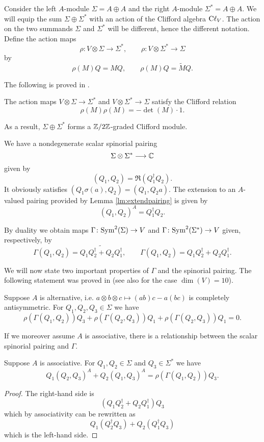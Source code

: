 \documentclass[10pt, oneside]{article}
\begin{document}
Consider the left $A$-module $\Sigma=A\oplus A$ and the right $A$-module $\Sigma^* = A\oplus A$.
We will equip the sum $\Sigma \oplus \Sigma^*$ with an action of the Clifford algebra ${\rm C}\ell_V$.  
The action on the two summands $\Sigma$ and $\Sigma^*$ will be different, hence the different notation.  
Define the action maps
\[\rho \colon V \otimes \Sigma\rightarrow \Sigma^*,\qquad \rho \colon V\otimes \Sigma^*\rightarrow \Sigma\]
by
\[\rho(M)Q = M Q,\qquad \rho(M)Q = \widetilde{M} Q.\]

The following is proved in \cite[Proposition 6]{BaezHuerta}.

\begin{prop}
The action maps $V\otimes \Sigma\rightarrow \Sigma^*$ and $V\otimes \Sigma^*\rightarrow \Sigma$ satisfy the Clifford relation
\[\rho(M)\rho(M) = -\det(M)\cdot 1.\]
\end{prop}

As a result, $\Sigma\oplus \Sigma^*$ forms a $\mathbb Z/2\mathbb Z$-graded Clifford module.

We have a nondegenerate scalar spinorial pairing
\[\Sigma\otimes \Sigma^*\longrightarrow \mathbb C\]
given by
\[(Q_1, Q_2) = \Re(Q_1^\dagger Q_2).\]
It obviously satisfies $(Q_1 \sigma(a), Q_2) = (Q_1, Q_2 a)$. The extension to an $A$-valued pairing provided by Lemma \ref{lm:extendpairing} is given by
\[(Q_1, Q_2)^A = Q_1^\dagger Q_2.\]

By duality we obtain maps $\Gamma\colon{\rm Sym}^2(\Sigma)\rightarrow V$ and $\Gamma\colon {\rm Sym}^2(\Sigma^*)\rightarrow V$ given, respectively, by
\[\Gamma(Q_1, Q_2) = \widetilde{Q_1Q_2^\dagger + Q_2Q_1^\dagger},\qquad \Gamma(Q_1, Q_2) = Q_1Q_2^\dagger + Q_2Q_1^\dagger.\]

We will now state two important properties of $\Gamma$ and the spinorial pairing. The following statement was proved in \cite[Theorem 11]{BaezHuerta} (see also \cite{Schray} for the case $\dim(V)=10$).

\begin{theorem}
Suppose $A$ is alternative, i.e. $a\otimes b\otimes c\mapsto (ab)c - a(bc)$ is completely antisymmetric. For $Q_1, Q_2, Q_3\in\Sigma$ we have
\[\rho(\Gamma(Q_1, Q_2))Q_3 + \rho(\Gamma(Q_2, Q_3))Q_1 + \rho(\Gamma(Q_2, Q_3))Q_1 = 0.\]
\label{thm:3psi}
\end{theorem}

If we moreover assume $A$ is associative, there is a relationship between the scalar spinorial pairing and $\Gamma$.

\begin{theorem}
Suppose $A$ is associative. For $Q_1, Q_2\in\Sigma$ and $Q_3\in\Sigma^*$ we have
\[Q_1(Q_2, Q_3)^A + Q_2(Q_1, Q_3)^A = \rho(\Gamma(Q_1, Q_2)) Q_3.\]
\label{thm:matter3psi}
\end{theorem}
\begin{proof}
The right-hand side is
\[(Q_1Q_2^\dagger + Q_2Q_1^\dagger)Q_3\]
which by associativity can be rewritten as
\[Q_1(Q_2^\dagger Q_3) + Q_2(Q_1^\dagger Q_3)\]
which is the left-hand side.
\end{proof}
\end{document}

